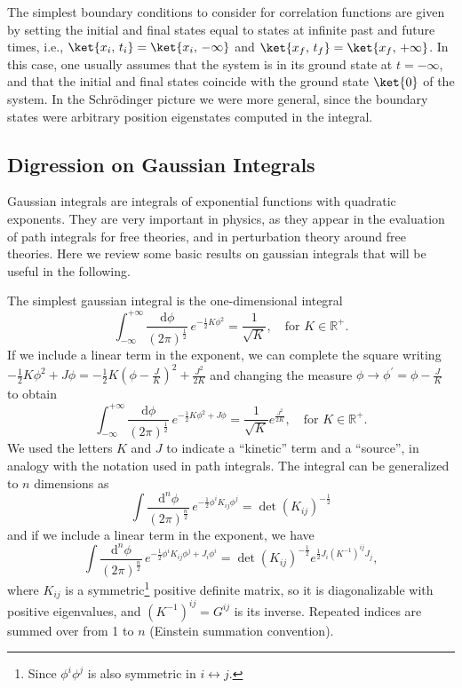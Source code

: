 The simplest boundary conditions to consider for correlation functions are given by setting the initial and final states equal to states at infinite past and future times, i.e., \(\ket{x_i,\, t_i} = \ket{x_i,\,-\infty}\) and \(\ket{x_f,\, t_f} = \ket{x_f,\, +\infty}\). In this case, one usually assumes that the system is in its ground state at \(t=-\infty\), and that the initial and final states coincide with the ground state \(\ket{0}\) of the system. In the Schrödinger picture we were more general, since the boundary states were arbitrary position eigenstates computed in the integral.

\subsection{Digression on Gaussian Integrals}\label{sec:gaussian_integrals}

Gaussian integrals are integrals of exponential functions with quadratic exponents. They are very important in physics, as they appear in the evaluation of path integrals for free theories, and in perturbation theory around free theories. Here we review some basic results on gaussian integrals that will be useful in the following.

The simplest gaussian integral is the one-dimensional integral
\[
    \int_{-\infty}^{+\infty}  \frac{\mathrm{d} \phi}{(2\pi)^{\tfrac{1}{2}}}\, e^{-\frac{1}{2} K \phi^2} = \frac{1}{\sqrt{K}}, \quad \text{for } K \in \mathbb{R}^+.
\]
If we include a linear term in the exponent, we can complete the square writing \(-\frac{1}{2}K \phi^2 + J \phi = -\frac{1}{2}K \left(\phi - \frac{J}{K}\right)^2 + \frac{J^2}{2K}\) and changing the measure \(\phi \to \phi^{\prime} = \phi - \frac{J}{K}\) to obtain
\[
    \int_{-\infty}^{+\infty} \frac{\mathrm{d} \phi}{(2\pi)^{\tfrac{1}{2}}} \, e^{-\frac{1}{2} K \phi^2 + J \phi} = \frac{1}{\sqrt{K}} e^{\frac{J^2}{2K}}, \quad \text{for } K \in \mathbb{R}^+.
\]
We used the letters \(K\) and \(J\) to indicate a “kinetic” term and a “source”, in analogy with the notation used in path integrals. The integral can be generalized to \(n\) dimensions as
\[
    \int \frac{\mathrm{d}^n \phi}{(2\pi)^{\tfrac{n}{2}}} \, e^{-\frac{1}{2} \phi^i K_{ij} \phi^j} = \det(K_{ij})^{-\frac{1}{2}}
\]
and if we include a linear term in the exponent, we have
\begin{equation}
    \int \frac{\mathrm{d}^n \phi}{(2\pi)^{\tfrac{n}{2}}} \, e^{-\frac{1}{2} \phi^i K_{ij} \phi^j + J_i \phi^i} = \det(K_{ij})^{-\frac{1}{2}} e^{\frac{1}{2} J_i (K^{-1})^{ij} J_j},
    \label{eq:n_dimensional_gaussian_integral}
\end{equation}
where \(K_{ij}\) is a symmetric\footnote{Since \(\phi^i \phi^j\) is also symmetric in \(i \leftrightarrow j\).} positive definite matrix, so it is diagonalizable with positive eigenvalues, and \((K^{-1})^{ij} = G^{ij}\) is its inverse. Repeated indices are summed over from 1 to \(n\) (Einstein summation convention).

